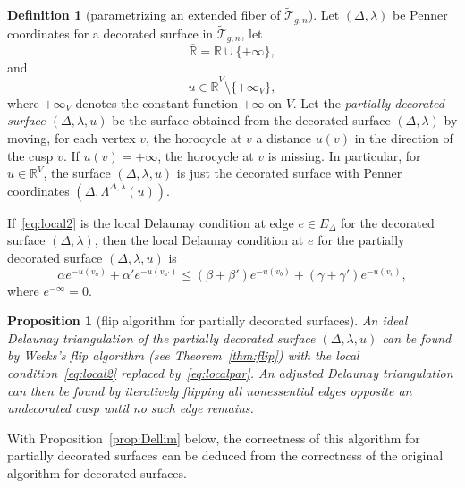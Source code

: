 \documentclass[a4paper, 11pt]{article}
\newcommand{\R}{\mathbb{R}}
\newcommand{\Rbar}{\overline{\R}}
\newcommand{\Teich}{\mathcal{T}}
\newcommand{\decTeich}{\widetilde{\Teich}}
\theoremstyle{plain}
\newtheorem{proposition}[theorem]{Proposition}
\theoremstyle{definition}
\newtheorem{definition}[theorem]{Definition}
\begin{document}
\begin{definition}[parametrizing an extended fiber of
  $\decTeich_{g,n}$]
  \label{def:extendedfiber}
  Let $(\Delta,\lambda)$ be Penner coordinates for a decorated surface
  in $\decTeich_{g,n}$, let
  \begin{equation}
    \label{eq:Rbar}
    \Rbar=\R\cup\{+\infty\}, 
  \end{equation}
  and
  \begin{equation*}
    u\in\Rbar^{V}\setminus\{+\infty_{V}\},
  \end{equation*}
  where $+\infty_{V}$ denotes the constant function $+\infty$ on
  $V$. Let the \emph{partially decorated surface $(\Delta,\lambda,u)$}
  be the surface obtained from the decorated surface
  $(\Delta,\lambda)$ by moving, for each vertex $v$, the horocycle at
  $v$ a distance $u(v)$ in the direction of the cusp $v$. If
  $u(v)=+\infty$, the horocycle at $v$ is missing. In particular, for
  $u\in\R^{V}$, the surface $(\Delta,\lambda,u)$ is just the decorated
  surface with Penner coordinates
  $(\Delta,\Lambda^{\Delta,\lambda}(u))$.
\end{definition}

If~\eqref{eq:local2} is the local Delaunay condition at edge
$e\in E_{\Delta}$ for the decorated surface $(\Delta,\lambda)$, then
the local Delaunay condition at $e$ for the partially decorated surface
$(\Delta,\lambda,u)$ is 
\begin{equation}
  \label{eq:localpar}
  \alpha e^{-u(v_{a})}+\alpha'e^{-u(v_{a'})}
  \leq(\beta+\beta')e^{-u(v_{b})}+(\gamma+\gamma')e^{-u(v_{c})},
\end{equation}
where $e^{-\infty}=0$. 

\begin{proposition}[flip algorithm for partially decorated surfaces]
  \label{prop:flippartial}
  An ideal Delaunay triangulation of the partially decorated surface
  $(\Delta,\lambda,u)$ can be found by Weeks's flip algorithm (see
  Theorem~\ref{thm:flip}) with the local condition~\eqref{eq:local2}
  replaced by~\eqref{eq:localpar}. An adjusted Delaunay triangulation
  can then be found by iteratively flipping all nonessential edges
  opposite an undecorated cusp until no such edge remains.
\end{proposition}

With Proposition~\ref{prop:Dellim} below, the correctness of this
algorithm for partially decorated surfaces can be deduced from the
correctness of the original algorithm for decorated surfaces.
\end{document}
